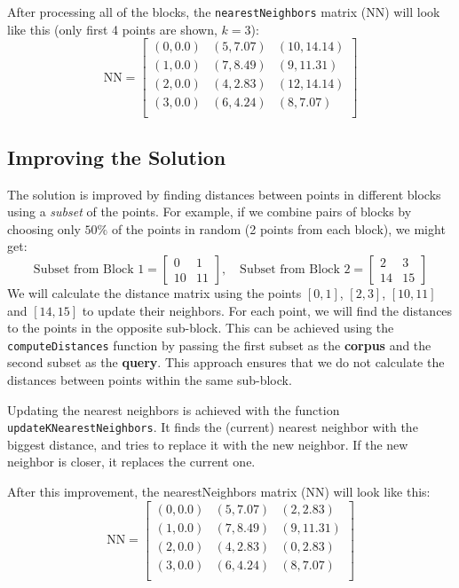 \documentclass{article}
\begin{document}
After processing all of the blocks, the \texttt{nearestNeighbors} matrix (NN) will look like this (only first 4 points are shown, $k=3$):
\[
\text{NN} = \begin{bmatrix}
(0, 0.0) & (5, 7.07) & (10, 14.14) \\
(1, 0.0) & (7, 8.49) & (9, 11.31) \\
(2, 0.0) & (4, 2.83) & (12, 14.14) \\
(3, 0.0) & (6, 4.24) & (8, 7.07) \\
\end{bmatrix}
\]

\subsection{Improving the Solution}
The solution is improved by finding distances between points in different blocks using a \emph{subset} of the points. 
For example, if we combine pairs of blocks by choosing only $50\%$ of the points in random (2 points from each block),
we might get:
\[
\text{Subset from Block 1} = \begin{bmatrix}
0 & 1 \\
10 & 11
\end{bmatrix}, \quad
\text{Subset from Block 2} = \begin{bmatrix}
2 & 3 \\
14 & 15
\end{bmatrix}
\]
We will calculate the distance matrix using the points $[0, 1]$, $[2, 3]$, $[10, 11]$ and $[14, 15]$ to update their
neighbors. For each point, we will find the distances to the points in the opposite sub-block. This can be
achieved using the \texttt{computeDistances} function by passing the first subset as the \textbf{corpus} and the second
subset as the \textbf{query}. This approach ensures that we do not calculate the distances between points within
the same sub-block.

Updating the nearest neighbors is achieved with the function \texttt{updateKNearestNeighbors}. It finds the (current) nearest neighbor with
the biggest distance, and tries to replace it with the new neighbor. If the new neighbor is closer, it replaces the current one.

After this improvement, the nearestNeighbors matrix (NN) will look like this:
\[
\text{NN} = \begin{bmatrix}
(0, 0.0) & (5, 7.07) & (2, 2.83) \\
(1, 0.0) & (7, 8.49) & (9, 11.31) \\
(2, 0.0) & (4, 2.83) & (0, 2.83) \\
(3, 0.0) & (6, 4.24) & (8, 7.07) \\
\end{bmatrix}
\]
\end{document}
